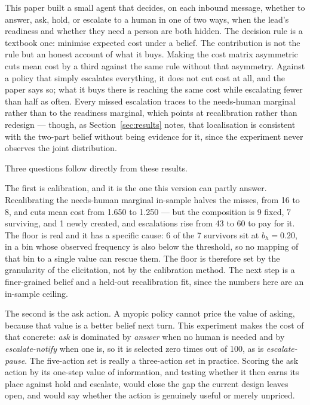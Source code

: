 \documentclass{article}
\begin{document}
This paper built a small agent that decides, on each inbound message, whether to
answer, ask, hold, or escalate to a human in one of two ways, when the lead's
readiness and whether they need a person are both hidden. The decision rule is a
textbook one: minimise expected cost under a belief. The contribution is not the
rule but an honest account of what it buys. Making the cost matrix asymmetric
cuts mean cost by a third against the same rule without that asymmetry. Against a
policy that simply escalates everything, it does not cut cost at all, and the
paper says so; what it buys there is reaching the same cost while escalating fewer
than half as often. Every missed escalation traces to the needs-human marginal
rather than to the readiness marginal, which points at recalibration rather than
redesign --- though, as Section~\ref{sec:results} notes, that localisation is
consistent with the two-part belief without being evidence for it, since the
experiment never observes the joint distribution.

Three questions follow directly from these results.

The first is calibration, and it is the one this version can partly answer.
Recalibrating the needs-human marginal in-sample halves the misses, from 16 to 8,
and cuts mean cost from 1.650 to 1.250 --- but the composition is 9 fixed, 7
surviving, and 1 newly created, and escalations rise from 43 to 60 to pay for it.
The floor is real and it has a specific cause: 6 of the 7 survivors sit at
$b_h = 0.20$, in a bin whose observed frequency is also below the threshold, so no
mapping of that bin to a single value can rescue them. The floor is therefore set
by the granularity of the elicitation, not by the calibration method. The next step
is a finer-grained belief and a held-out recalibration fit, since the numbers here
are an in-sample ceiling.

The second is the ask action. A myopic policy cannot price the value of asking,
because that value is a better belief next turn. This experiment makes the cost of
that concrete: \emph{ask} is dominated by \emph{answer} when no human is needed and
by \emph{escalate-notify} when one is, so it is selected zero times out of 100, as
is \emph{escalate-pause}. The five-action set is really a three-action set in
practice. Scoring the ask action by its
one-step value of information, and testing whether it then earns its place against
hold and escalate, would close the gap the current design leaves open, and would
say whether the action is genuinely useful or merely unpriced.
\end{document}
